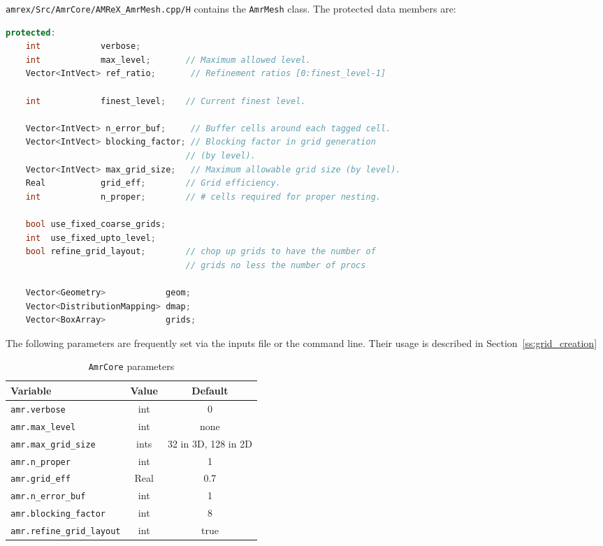 {\tt amrex/Src/AmrCore/AMReX\_AmrMesh.cpp/H} contains the {\tt AmrMesh} class.
The protected data members are:
\begin{lstlisting}[language=cpp]
protected:
    int            verbose;
    int            max_level;       // Maximum allowed level.
    Vector<IntVect> ref_ratio;       // Refinement ratios [0:finest_level-1]

    int            finest_level;    // Current finest level.

    Vector<IntVect> n_error_buf;     // Buffer cells around each tagged cell.
    Vector<IntVect> blocking_factor; // Blocking factor in grid generation 
                                    // (by level).
    Vector<IntVect> max_grid_size;   // Maximum allowable grid size (by level).
    Real           grid_eff;        // Grid efficiency.
    int            n_proper;        // # cells required for proper nesting.

    bool use_fixed_coarse_grids;
    int  use_fixed_upto_level;
    bool refine_grid_layout;        // chop up grids to have the number of 
                                    // grids no less the number of procs

    Vector<Geometry>            geom;
    Vector<DistributionMapping> dmap;
    Vector<BoxArray>            grids;    
\end{lstlisting}

The following parameters are frequently set via the inputs file or the command line.  
Their usage is described in Section~\ref{ss:grid_creation}

\begin{table}[h]
  \centering
  \begin{tabular}{lcc}
    Variable & Value & Default \\
    \hline
    {\tt amr.verbose}              & int  & 0    \\
    {\tt amr.max\_level}           & int  & none \\
    {\tt amr.max\_grid\_size}      & ints & 32 in 3D, 128 in 2D \\
    {\tt amr.n\_proper}            & int  & 1    \\
    {\tt amr.grid\_eff}            & Real & 0.7  \\
    {\tt amr.n\_error\_buf}        & int  & 1    \\
    {\tt amr.blocking\_factor}     &int   & 8    \\
    {\tt amr.refine\_grid\_layout} &int   & true \\
    \hline
  \end{tabular}
  \caption{\label{tab:makevarimp} {\tt AmrCore} parameters}
\end{table}


